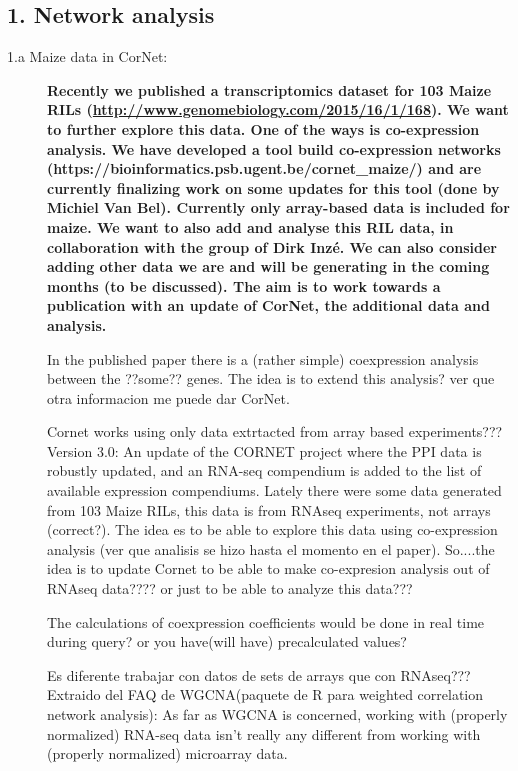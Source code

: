 \documentclass[a4paper,10pt]{article}
\begin{document}
\subsection{1. Network analysis}
\begin{description}
 \item [1.a Maize data in CorNet:] \textbf{Recently we published a transcriptomics dataset for 103 Maize RILs (\url{http://www.genomebiology.com/2015/16/1/168}). 
 We want to further explore this data. One of the ways is co-expression analysis. 
 We have developed a tool build co-expression networks (https://bioinformatics.psb.ugent.be/cornet\_maize/) and are currently finalizing work on some updates for this tool (done by Michiel Van Bel). 
 Currently only array-based data is included for maize. We want to also add and analyse this RIL data, in collaboration with the group of Dirk Inzé. 
 We can also consider adding other data we are and will be generating in the coming months (to be discussed). The aim is to work towards a publication with an update of CorNet, the additional data and analysis. }
 
  In the published paper there is a (rather simple) coexpression analysis between the ??some?? genes. The idea is to extend this analysis? ver que otra informacion me puede dar CorNet. 
 
 Cornet works using only data extrtacted from array based experiments??? Version 3.0: An update of the CORNET project where the PPI data is robustly updated, and an RNA-seq compendium is added to the list of available expression compendiums. 
 Lately there were some data generated from 103 Maize RILs, this data is from RNAseq experiments, not arrays (correct?). 
 The idea es to be able to explore this data using co-expression analysis (ver que analisis se hizo hasta el momento en el paper). So....the idea is to update Cornet to be able to make co-expresion analysis out of RNAseq data????
 or just to be able to analyze this data???   
 
 
  The calculations of coexpression coefficients would be done in real time during query? or you have(will have) precalculated values?  
  
   Es diferente trabajar con datos de sets de arrays que con RNAseq??? Extraido del FAQ de WGCNA(paquete de R para weighted correlation network analysis): 
   As far as WGCNA is concerned, working with (properly normalized) RNA-seq data isn't really any different from working with (properly normalized) microarray data. 
   

\end{description}
\end{document}
